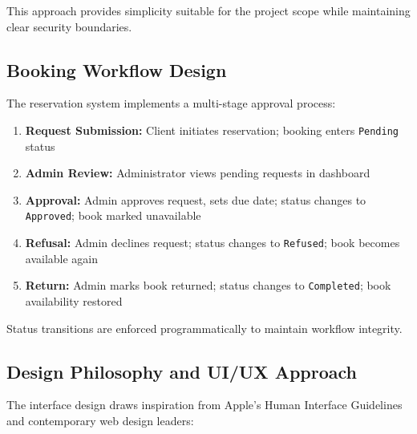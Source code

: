 \documentclass[12pt,a4paper]{article}
\begin{document}
This approach provides simplicity suitable for the project scope while maintaining clear security boundaries.

\subsection{Booking Workflow Design}

The reservation system implements a multi-stage approval process:

\begin{enumerate}[leftmargin=*]
    \item \textbf{Request Submission:} Client initiates reservation; booking enters \texttt{Pending} status
    \item \textbf{Admin Review:} Administrator views pending requests in dashboard
    \item \textbf{Approval:} Admin approves request, sets due date; status changes to \texttt{Approved}; book marked unavailable
    \item \textbf{Refusal:} Admin declines request; status changes to \texttt{Refused}; book becomes available again
    \item \textbf{Return:} Admin marks book returned; status changes to \texttt{Completed}; book availability restored
\end{enumerate}

Status transitions are enforced programmatically to maintain workflow integrity.

\subsection{Design Philosophy and UI/UX Approach}

The interface design draws inspiration from Apple's Human Interface Guidelines and contemporary web design leaders:
\end{document}
